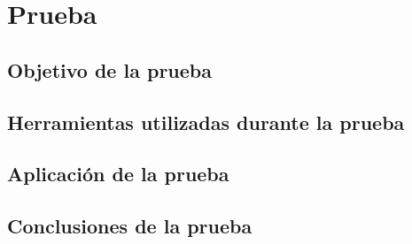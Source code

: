 \section{Prueba}


\subsection{Objetivo de la prueba}
\subsection{Herramientas utilizadas durante la prueba}
\subsection{Aplicación de la prueba}
\subsection{Conclusiones de la prueba}

